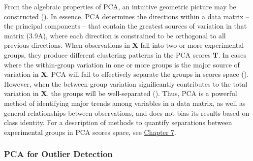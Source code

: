 \begin{doublespace}
From the algebraic properties of PCA, an intuitive geometric picture may be
constructed (). In essence, PCA determines the
directions within a data matrix -- the principal components -- that contain
the greatest sources of variation in that matrix (3.9A), where each direction
is constrained to be orthogonal to all previous directions. When observations
in $\mathbf{X}$ fall into two or more experimental groups, they produce
different clustering patterns in the PCA scores $\mathbf{T}$. In cases where
the within-group variation in one or more groups is the major source of
variation in $\mathbf{X}$, PCA will fail to effectively separate the groups
in scores space (). However, when the between-group
variation significantly contributes to the total variation in $\mathbf{X}$,
the groups will be well-separated (). Thus, PCA is a
powerful method of identifying major trends among variables in
a data matrix, as well as general relationships between observations, and does
not bias its results based on class identity. For a description of methods to
quantify separations between experimental groups in PCA scores space, see
\hyperlink{chapter.7}{Chapter 7}.
\end{doublespace}

\subsubsection{PCA for Outlier Detection}

